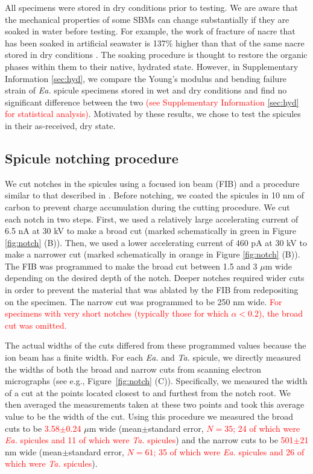 \documentclass[12pt,onecolumn]{article}
\makeatletter
\newcommand{\TA}{\textit{Ta.\@}\xspace}
\newcommand{\EA}{\textit{Ea.\@}\xspace}
\makeatother
\begin{document}
\begin{bibunit}
All specimens were stored in dry conditions prior to testing. We are aware that the mechanical properties of some SBMs can change substantially if they are soaked in water before testing. For example, the work of fracture of nacre that has been soaked in artificial seawater is 137\% higher than that of the same nacre stored in dry conditions \cite{jackson1988}. The soaking procedure is thought to restore the organic phases within them to their native, hydrated state.  However, in Supplementary Information \ref{sec:hyd}, we compare the Young's modulus and bending failure strain of \EA spicule specimens stored in wet and dry conditions and find no significant difference between the two \textcolor{red}{(see Supplementary Information \ref{sec:hyd} for statistical analysis)}. Motivated by these results, we chose to test the spicules in their as-received, dry state.

\subsection{Spicule notching procedure}
\label{sec:notchconfig}
We cut notches in the spicules using a focused ion beam (FIB) and a procedure similar to that described in \cite{jaya2015can}. Before notching, we coated the spicules in 10 nm of carbon to prevent charge accumulation during the cutting procedure. We cut each notch in two steps. First, we used a relatively large accelerating current of 6.5 nA at 30 kV to make a broad cut (marked schematically in green in Figure \ref{fig:notch} (B)). Then, we used a lower accelerating current of 460 pA at 30 kV to make a narrower cut (marked schematically in orange in Figure \ref{fig:notch} (B)). The FIB was programmed to make the broad cut between 1.5 and 3 $\mu$m wide depending on the desired depth of the notch. Deeper notches required wider cuts in order to prevent the material that was ablated by the FIB from redepositing on the specimen. The narrow cut was programmed to be 250 nm wide. \textcolor{red}{For specimens with very short notches (typically those for which $\alpha<$0.2), the broad cut was omitted.}

The actual widths of the cuts differed from these programmed values because the ion beam has a finite width. For each \EA and \TA spicule, we directly measured the widths of both the broad and narrow cuts from scanning electron micrographs (see e.g., Figure~\ref{fig:notch} (C)). Specifically, we measured the width of a cut at the points located closest to and furthest from the notch root. We then averaged the measurements taken at these two points and took this average value to be the width of the cut. Using this procedure we measured the broad cuts to be \textcolor{red}{3.58$\pm$0.24} $\mu$m wide (mean$\pm$standard error, \textcolor{red}{$N=35$; 24 of which were \EA spicules and 11 of which were \TA spicules}) and the narrow cuts to be \textcolor{red}{501$\pm$21} nm wide (mean$\pm$standard error, \textcolor{red}{$N=61$; 35 of which were \EA spicules and 26 of which were \TA spicules}).


\end{bibunit}
\end{document}
